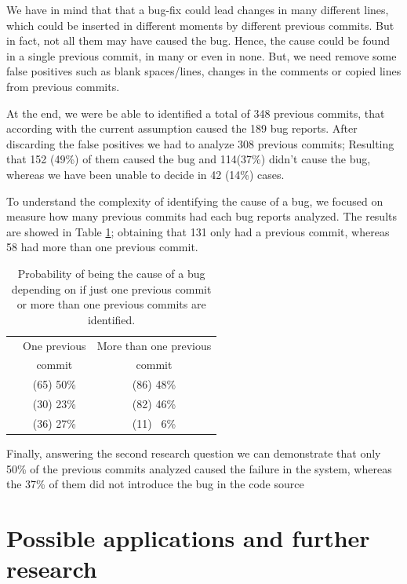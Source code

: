 \documentclass[ifip]{svmult}
\begin{document}
We have in mind that that a bug-fix could lead changes in many different lines, which could be inserted in different moments by different previous commits. But in fact, not all them may have caused the bug. Hence, the cause could be found in a single previous commit, in many or even in none. But, we need remove some false positives such as blank spaces/lines, changes in the comments or  copied lines from previous commits.  

At the end, we were be able to identified a total of 348 previous commits, that according with the current assumption caused the 189 bug reports. After discarding the false positives we had to analyze 308 previous commits; Resulting that 152 (49\%) of them caused the bug and 114(37\%) didn't cause the bug, whereas we have been unable to decide in 42 (14\%) cases.

To understand the complexity of identifying the cause of a bug, we focused on measure how many previous commits had each bug reports analyzed. The results are showed in Table \ref{tab:secondStage}; obtaining that 131 only had a previous commit, whereas 58 had more than one previous commit. 

\begin{table}[htb]
\begin{center} {\footnotesize
\begin{tabular}{lcc}
\toprule[0.3mm]
  & \multicolumn{1}{c}{One previous } & \multicolumn{1}{c}{More than one previous} \\
  & \multicolumn{1}{c}{commit} & \multicolumn{1}{c}{commit} \\\hline
\raisebox{1ex}{Cause}     & (65) 50\% & (86) 48\% \\[0ex]
\raisebox{1ex}{Not cause} & (30) 23\% & (82) 46\% \\[0ex]
\raisebox{1ex}{Undecided} & (36) 27\% & (11) ~6\% \\[0ex]
\bottomrule[0.3mm]
\end{tabular} }
\caption{Probability of being the cause of a bug depending on if just one previous commit or more than one previous commits are identified.}
\label{tab:secondStage}
\end{center}
\end{table}

Finally, answering the second research question we can demonstrate that only 50\% of the previous commits analyzed caused the failure in the system, whereas the 37\% of them did not introduce the bug in the code source 

\section{Possible applications and further research}
\label{sec:discussion}
\end{document}
